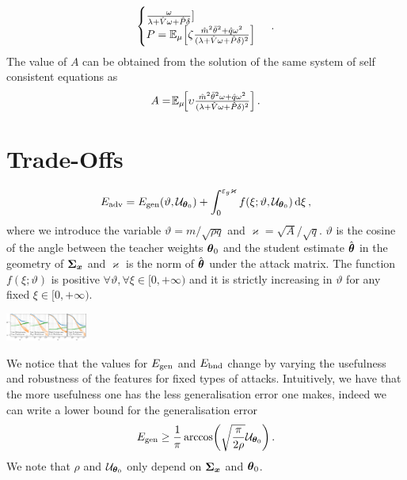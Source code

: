\documentclass[a0paper,fleqn]{betterportraitposter}
\theoremstyle{plain}
\theoremstyle{definition}
\theoremstyle{remark}
\begin{document}
{\begin{multicols}{3}
\begin{equation}
\begin{cases}
            \frac{\omega}{\lambda + \hat{V} \omega + \hat{P} \delta } 
        ] \\
        P = \mathbb{E}_{\mu} \qty[ 
            \zeta \frac{
                \hat{m}^2 \bar{\theta}^2 + \hat{q} \omega^2
            }{
                (\lambda + \hat{V} \omega + \hat{P} \delta)^2
            } 
        ] 
    \end{cases}\,.
\end{equation}
The value of \(A\) can be obtained from the solution of the same system of self consistent equations as
\begin{equation}
    A = \! \mathbb{E}_{\mu} \! \qty[ 
    {\textstyle
        \upsilon \frac{\hat{m}^2 \bar{\theta}^2 \omega + \hat{q} \omega^2}{(\lambda + \hat{V} \omega + \hat{P} \delta)^2} 
    }
    ] \,.
\end{equation}


\section{Trade-Offs}

\begin{equation}
    E_{\mathrm{adv}} = 
    {
        E_{\mathrm{gen}}(\vartheta, \mathcal{U}_{\boldsymbol{\theta}_0}) + 
        \int_{0}^{\varepsilon_g \varkappa } 
        f(\xi; \vartheta, \mathcal{U}_{\boldsymbol{\theta}_0}) \dd{\xi}
    } \,,
\end{equation}
where we introduce the variable \(\vartheta = m / \sqrt{\rho q}\) and \(\varkappa = \sqrt{A} / \sqrt{q}\). 
\(\vartheta\) is the cosine of the angle between the teacher weights \(\boldsymbol{\theta}_0\) and the student estimate \(\hat{\boldsymbol{\theta}}\) in the geometry of \(\boldsymbol{\Sigma}_{\boldsymbol{\boldsymbol{x}}}\) and \(\varkappa\) is the norm of \(\hat{\boldsymbol{\theta}}\) under the attack matrix.
The function \(f(\xi;\vartheta)\) is positive \(\forall \vartheta, \forall \xi \in [0, +\infty)\) and it is strictly increasing in \(\vartheta\) for any fixed \(\xi \in [0,+\infty)\). 

\includegraphics[width=0.2\textwidth]{Assets/feature_combinations_alpha_sweep.pdf}


We notice that the values for \(E_{\mathrm{gen}}\) and \(E_{\mathrm{bnd}}\) change by varying the usefulness and robustness of the features for fixed types of attacks. 
Intuitively, we have that the more usefulness one has the less generalisation error one makes, indeed we can write a lower bound for the generalisation error
\begin{equation}\label{eq:bound-gen-error}
    E_{\mathrm{gen}}
    \geq
    \frac{1}{\pi} \arccos( \sqrt{\frac{\pi}{2 \rho}} \mathcal{U}_{\boldsymbol{\theta}_0} ) \,. 
\end{equation}
We note that \(\rho\) and \(\mathcal{U}_{\boldsymbol{\theta}_0}\) only depend on \(\boldsymbol{\Sigma}_{\boldsymbol{\boldsymbol{x}}}\) and \(\boldsymbol{\theta}_0\).


\end{multicols}}
\end{document}
